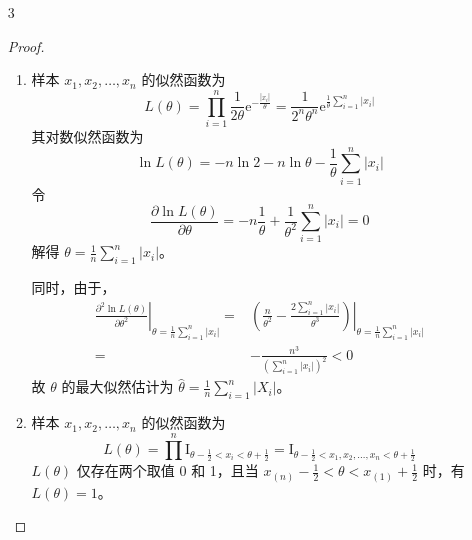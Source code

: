 \documentclass[normal,founder,mtpro2,cn]{elegantnote}
\begin{document}
\begin{enumerate}
\begin{proof}
\begin{enumerate}
                      故 $\theta$ 的最大似然估计为 $\hat{\theta}=\frac{X_{(n)}}{k+1}$。
            \end{enumerate}
        \end{proof}
    \item[3]
        \begin{proof}
            \begin{enumerate}
                \item
                      样本 $x_{1},x_{2},\ldots,x_{n}$ 的似然函数为
                      \begin{equation*}
                          L(\theta)=\prod_{i=1}^{n}\frac{1}{2\theta}\mathrm{e}^{-\frac{|x_{i}|}{\theta}}=\frac{1}{2^{n}\theta^{n}}\mathrm{e}^{\frac{1}{\theta}\sum_{i=1}^{n}\left|x_{i}\right|}
                      \end{equation*}
                      其对数似然函数为
                      \begin{equation*}
                          \ln L(\theta)=-n\ln 2-n\ln\theta-\frac{1}{\theta}\sum_{i=1}^{n}|x_{i}|
                      \end{equation*}
                      令
                      \begin{equation*}
                          \frac{\partial\ln L(\theta)}{\partial\theta}=-n\frac{1}{\theta}+\frac{1}{\theta^{2}}\sum_{i=1}^{n}|x_{i}|=0
                      \end{equation*}
                      解得 $\theta=\frac{1}{n}\sum_{i=1}^{n}|x_{i}|$。

                      同时，由于，
                      \begin{equation*}
                          \begin{aligned}
                              \left.\frac{\partial^{2}\ln L(\theta)}{\partial\theta^{2}}\right|_{\theta=\frac{1}{n}\sum_{i=1}^{n}|x_{i}|}= & \left.\left(\frac{n}{\theta^{2}}-\frac{2\sum_{i=1}^{n}|x_{i}|}{\theta^{3}}\right)\right|_{\theta=\frac{1}{n}\sum_{i=1}^{n}|x_{i}|} \\
                              =                                                                                                            & -\frac{n^{3}}{\left(\sum_{i=1}^{n}|x_{i}|\right)^{2}}<0
                          \end{aligned}
                      \end{equation*}
                      故 $\theta$ 的最大似然估计为 $\hat{\theta}=\frac{1}{n} \sum_{i=1}^{n}\left|X_{i}\right|$。
                \item
                      样本 $x_{1},x_{2},\ldots,x_{n}$ 的似然函数为
                      \begin{equation*}
                          L(\theta)=\prod^{n}\mathrm{I}_{\theta-\frac{1}{2}<x_{i}<\theta+\frac{1}{2}}=\mathrm{I}_{\theta-\frac{1}{2}<x_{1},x_{2},\ldots,x_{n}<\theta+\frac{1}{2}}
                      \end{equation*}
                      $L(\theta)$ 仅存在两个取值 0 和 1，且当 $x_{(n)}-\frac{1}{2}<\theta<x_{(1)}+\frac{1}{2}$ 时，有 $L(\theta)=1$。


\end{enumerate}
\end{proof}
\end{enumerate}
\end{document}
